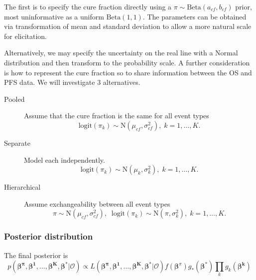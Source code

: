 \documentclass[AMA,STIX1COL]{WileyNJD-v2}
\begin{document}
The first is to specify the cure fraction directly using a
$\pi \sim \text{Beta}(a_{cf}, b_{cf})$ prior, most uninformative as a uniform
$\text{Beta}(1,1)$. The parameters can be obtained via transformation of mean
and standard deviation to allow a more natural scale for elicitation.

Alternatively, we may specify the uncertainty on the real line with a
Normal distribution and then transform to the probability scale.
A further consideration is how to represent the cure fraction so to
share information between the OS and PFS data. We will investigate 3
alternatives.

\begin{description}
    \item[Pooled] Assume that the cure fraction is the same for all event types
    $$
    \text{logit}(\pi_k) \sim \text{N}(\mu_{cf}, \sigma_{cf}^2), \; k = 1, \ldots, K.
    $$
    \item[Separate] Model each independently.
    $$
    \text{logit}(\pi_k) \sim \text{N}(\mu_k, \sigma_k^2), \; k = 1, \ldots, K.
    $$
    \item[Hierarchical] Assume exchangeability between all event types
    $$
    \pi \sim \text{N}(\mu_{cf}, \sigma_{cf}^2), \;\;  
    \text{logit}(\pi_k) \sim \text{N}(\pi, \sigma_k^2), \; k = 1, \ldots, K.  
    $$
\end{description}

\subsubsection{Posterior distribution}
The final posterior is
\begin{equation}
\label{eqn:basic_posterior}
p(\boldsymbol{\beta^{\pi}}, \boldsymbol{\beta^{1}}, \ldots, \boldsymbol{\beta^{K}}, \boldsymbol{\beta^*} | \mathcal{O}) \propto
L(\boldsymbol{\beta^{\pi}}, \boldsymbol{\beta^{1}}, \ldots, \boldsymbol{\beta^{K}}, \boldsymbol{\beta^*} | \mathcal{O})
    f(\boldsymbol{\beta}^{\pi}) g_*(\boldsymbol{\beta^*}) \prod_k g_{k}(\boldsymbol{\beta^{k}})
\end{equation}
\end{document}
